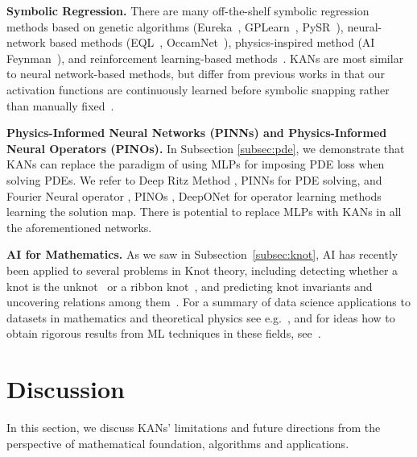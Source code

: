 \documentclass{article}
\numberwithin{equation}{section}
\numberwithin{figure}{section}
\begin{document}
{\bf Symbolic Regression.} There are many off-the-shelf symbolic regression methods based on genetic algorithms (Eureka~\cite{Dubckov2011EureqaSR}, GPLearn~\cite{gplearn}, PySR~\cite{cranmer2023interpretable}), neural-network based methods (EQL~\cite{martius2016extrapolation}, OccamNet~\cite{dugan2020occamnet}), physics-inspired method (AI Feynman~\cite{udrescu2020ai,udrescu2020ai2}), and reinforcement learning-based methods~\cite{mundhenk2021symbolic}. KANs are most similar to neural network-based methods, but differ from previous works in that our activation functions are continuously learned before symbolic snapping rather than manually fixed~\cite{Dubckov2011EureqaSR,dugan2020occamnet}.


{\bf Physics-Informed Neural Networks (PINNs) and Physics-Informed Neural Operators (PINOs).}
In Subsection \ref{subsec:pde}, we demonstrate that KANs can replace the paradigm of using MLPs for imposing PDE loss when solving PDEs. We refer to Deep Ritz Method \cite{yu2018deep}, PINNs \cite{raissi2019physics, karniadakis2021physics, cho2024separable} for PDE solving, and Fourier Neural operator \cite{li2020fourier}, PINOs \cite{li2021physics, kovachki2023neural, maust2022fourier}, DeepONet \cite{lu2021learning} for operator learning methods learning the solution map. There is potential to replace MLPs with KANs in all the aforementioned networks. 

{\bf AI for Mathematics.} As we saw in Subsection~\ref{subsec:knot}, AI has recently been applied to several problems in Knot theory, including detecting whether a knot is the unknot~\cite{Gukov:2020qaj,kauffman2020rectangular} or a ribbon knot~\cite{gukov2023searching}, and predicting knot invariants and uncovering relations among them~\cite{hughes2020neural,Craven:2020bdz,Craven:2022cxe,davies2021advancing}. For a summary of data science applications to datasets in mathematics and theoretical physics see e.g.~\cite{Ruehle:2020jrk,he2023machine}, and for ideas how to obtain rigorous results from ML techniques in these fields,  see~\cite{Gukov:2024aaa}.


\section{Discussion}\label{sec:discussion}

In this section, we discuss KANs' limitations and future directions from the perspective of mathematical foundation, algorithms and applications.
\end{document}
